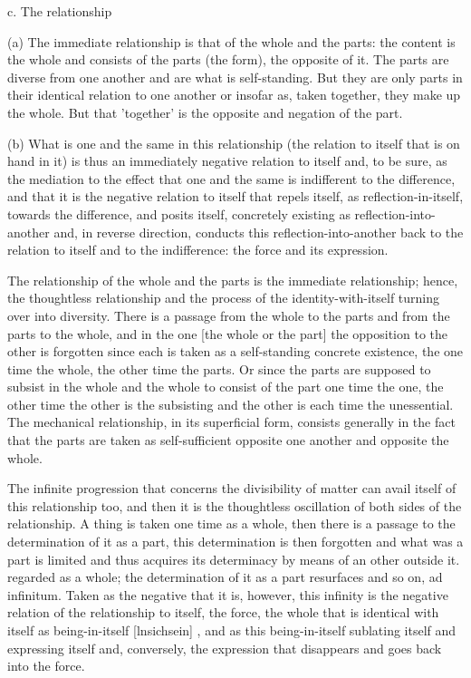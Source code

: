 c. The relationship

(a) The immediate relationship is that of the whole and the parts:
the content is the whole and consists of the parts (the form), the opposite of it.
The parts are diverse from one another and are what is self-standing.
But they are only parts in their identical relation to one another
or insofar as, taken together, they make up the whole.
But that 'together' is the opposite and negation of the part.

(b) What is one and the same in this relationship
(the relation to itself that is on hand in it)
is thus an immediately negative relation to itself and,
to be sure, as the mediation to the effect that one and the same
is indifferent to the difference, and that
it is the negative relation to itself that repels itself,
as reflection-in-itself, towards the difference, and posits itself,
concretely existing as reflection-into-another and, in reverse direction,
conducts this reflection-into-another back to
the relation to itself and to the indifference:
the force and its expression.

    The relationship of the whole and the parts is the immediate relationship;
    hence, the thoughtless relationship and the process of
    the identity-with-itself turning over into diversity.
    There is a passage from the whole to the parts and
    from the parts to the whole, and in the one [the whole or the part]
    the opposition to the other is forgotten since
    each is taken as a self-standing concrete existence,
    the one time the whole, the other time the parts.
    Or since the parts are supposed to subsist in the whole and
    the whole to consist of the part one time the one,
    the other time the other is the subsisting and
    the other is each time the unessential.
    The mechanical relationship, in its superficial form,
    consists generally in the fact that the parts are taken as self-sufficient
    opposite one another and opposite the whole.

    The infinite progression that concerns the divisibility of matter
    can avail itself of this relationship too, and then it is the thoughtless
    oscillation of both sides of the relationship.
    A thing is taken one time as a whole,
    then there is a passage to the determination of it as a part,
    this determination is then forgotten and
    what was a part is limited and thus acquires its determinacy
    by means of an other outside it.
    regarded as a whole; the determination of it as a part resurfaces and
    so on, ad infinitum.
    Taken as the negative that it is, however, this
    infinity is the negative relation of the relationship to itself, the force,
    the whole that is identical with itself as being-in-itself [lnsichsein] ,
    and as this being-in-itself sublating itself and expressing itself and,
    conversely, the expression that disappears and goes back into the force.

